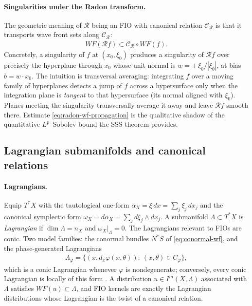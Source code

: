 \documentclass[12pt]{article}
\numberwithin{equation}{section}
\numberwithin{figure}{section}
\numberwithin{equation}{section}
\newcommand{\abs}[1]{\left|#1\right|}
\begin{document}
\paragraph{Singularities under the Radon transform.}
The geometric meaning of $\mathcal R$ being an FIO with canonical relation
$\mathcal{C}_{\mathcal R}$ is that it transports wave front sets along $\mathcal{C}_{\mathcal R}$:
\begin{align}
    WF(\mathcal Rf)\subset \mathcal{C}_{\mathcal R}\circ WF(f).
    \label{eq:radon-wf-propagation}
\end{align}
Concretely, a singularity of $f$ at $(x_0,\xi_0)$ produces a singularity of
$\mathcal Rf$ over precisely the hyperplane through $x_0$ whose unit normal is
$w=\pm\,\xi_0/\abs{\xi_0}$, at bias $b=w\cdot x_0$.  The intuition is transversal
averaging: integrating $f$ over a moving family of hyperplanes detects a jump of
$f$ across a hypersurface only when the integration plane is \emph{tangent} to that
hypersurface (its normal aligned with $\xi_0$). Planes meeting the singularity
transversally average it away and leave $\mathcal Rf$ smooth there.  Estimate
\eqref{eq:radon-wf-propagation} is the qualitative shadow of the quantitative
$L^p$--Sobolev bound the SSS theorem provides.

\subsection{Lagrangian submanifolds and canonical relations}
\label{app:lagrangian}

\paragraph{Lagrangians.}
Equip $T^*X$ with the tautological one-form $\alpha_X=\xi\,dx=\sum_j\xi_j\,dx_j$
and the canonical symplectic form $\omega_X=d\alpha_X=\sum_j d\xi_j\wedge dx_j$.  A
submanifold $\Lambda\subset T^*X$ is \emph{Lagrangian} if $\dim\Lambda=n_X$ and
$\omega_X|_\Lambda=0$.  The Lagrangians relevant to FIOs are conic.  Two model
families: the conormal bundles $N^*S$ of \eqref{eq:conormal-wf}, and the
phase-generated Lagrangians
\begin{align*}
    \Lambda_\varphi
    =\bigl\{(x,d_x\varphi(x,\theta)):\ (x,\theta)\in C_\varphi\bigr\},
\end{align*}
which is a conic Lagrangian whenever $\varphi$ is nondegenerate; conversely, every
conic Lagrangian is locally of this form
\cite[\S3.1]{hormander_LagrangianDistributionsFourier_2009}.  A distribution
$u\in I^m(X,\Lambda)$ associated with $\Lambda$ satisfies $WF(u)\subset\Lambda$,
and FIO kernels are exactly the Lagrangian distributions whose Lagrangian is the
twist of a canonical relation.
\end{document}
